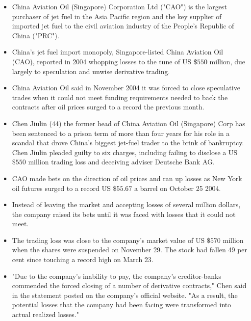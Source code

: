 \documentclass[]{article}
\begin{document}
\begin{itemize}
\item China Aviation Oil (Singapore) Corporation Ltd ("CAO") is the largest purchaser of jet fuel in the Asia Pacific region and the key supplier of imported jet fuel to the civil aviation industry of the People's Republic of China ("PRC").
\item China's jet fuel import monopoly, Singapore-listed China Aviation Oil (CAO), reported in 2004 whopping losses to the tune of US $\$550$ million, due largely to speculation and unwise derivative trading.

\item China Aviation Oil said in November 2004 it was forced to close speculative trades when it could not meet funding requirements needed to back the contracts after oil prices surged to a record the previous month.

\item Chen Jiulin (44) the former head of China Aviation Oil (Singapore) Corp has been sentenced to a prison term of more than four years for his role in a scandal that drove China's biggest jet-fuel trader to the brink of bankruptcy.  Chen Jiulin pleaded guilty to six charges, including failing to disclose a US $\$550$ million trading loss and deceiving adviser Deutsche Bank AG.

\item CAO made bets on the direction of oil prices and ran up losses as New York oil futures surged to a record US $\$55.67$ a barrel on October 25 2004.

\item Instead of leaving the market and accepting losses of several million dollars, the company raised its bets until it was faced with losses that it could not meet.

\item The trading loss was close to the company's market value of US $\$570$ million when the shares were suspended on November 29. The stock had fallen 49 per cent since touching a record high on March 23.

\item "Due to the company's inability to pay, the company's creditor-banks commended the forced closing of a number of derivative contracts," Chen said in the statement posted on the company's official website. "As a result, the potential losses that the company had been facing were transformed into actual realized losses."

\end{itemize}
\end{document}
